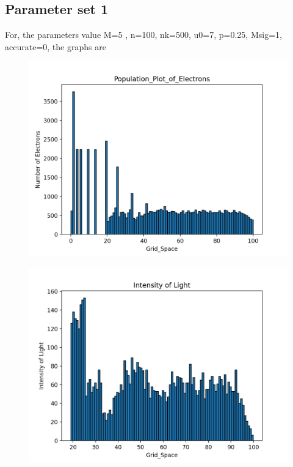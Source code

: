 \documentclass[11pt, a4paper]{article}
\begin{document}
\subsection{Parameter set 1}
For, the parameters value M=5 , n=100, nk=500, u0=7, p=0.25, Msig=1, accurate=0, the graphs are
\begin{figure}[!tbh]
    \centering
    \includegraphics[scale = 0.7]{default_1.png}
\end{figure}
\begin{figure}[!tbh]
    \centering
    \includegraphics[scale = 0.7]{default_2.png}
\end{figure}
\end{document}
